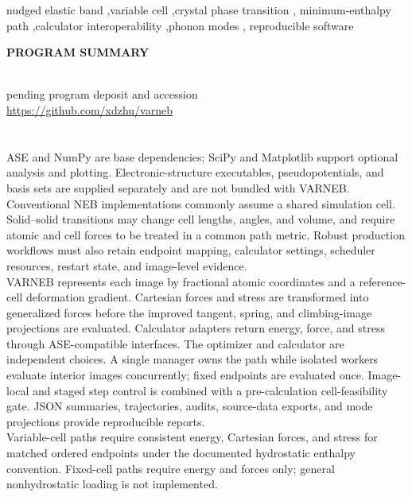 \documentclass[final,5p,times,twocolumn]{elsarticle}
\begin{document}
\begin{frontmatter}
\begin{keyword}
nudged elastic band \sep variable cell \sep crystal phase transition \sep
minimum-enthalpy path \sep calculator interoperability \sep phonon modes \sep
reproducible software
\end{keyword}
\end{frontmatter}

{\bf PROGRAM SUMMARY}
\begin{small}
\\
 pending program deposit and accession\\
 \url{https://github.com/xdzhu/varneb}\\
\\
\\
 ASE and NumPy are base
dependencies; SciPy and Matplotlib support optional analysis and plotting.
Electronic-structure executables, pseudopotentials, and basis sets are
supplied separately and are not bundled with VARNEB.\\
 Conventional NEB implementations commonly
assume a shared simulation cell. Solid--solid transitions may change cell
lengths, angles, and volume, and require atomic and cell forces to be treated
in a common path metric. Robust production workflows must also retain endpoint
mapping, calculator settings, scheduler resources, restart state, and
image-level evidence.\\
 VARNEB represents each image by fractional
atomic coordinates and a reference-cell deformation gradient. Cartesian forces
and stress are transformed into generalized forces before the improved tangent,
spring, and climbing-image projections are evaluated. Calculator adapters
return energy, force, and stress through ASE-compatible interfaces. The
optimizer and calculator are independent choices. A single manager owns the
path while isolated workers evaluate interior images concurrently; fixed
endpoints are evaluated once. Image-local and staged step control is combined
with a pre-calculation cell-feasibility gate. JSON summaries, trajectories,
audits, source-data exports, and mode projections provide reproducible reports.
\\
 Variable-cell paths require consistent energy,
Cartesian forces, and stress for matched ordered endpoints under the
documented hydrostatic enthalpy convention. Fixed-cell paths require energy
and forces only; general nonhydrostatic loading is not implemented.
\end{small}
\end{document}
